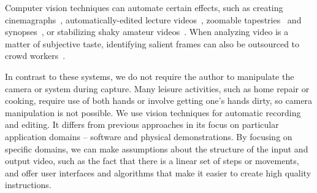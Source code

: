


Computer vision techniques can automate certain effects, such as creating cinemagraphs~\cite{Bai:2012, Joshi:2012}, automatically-edited lecture videos~\cite{Heck:2007}, zoomable tapestries~\cite{Barnes:2010} and synopses~\cite{Pritch:2009vl}, or stabilizing shaky amateur videos~\cite{Liu:2011}. When analyzing video is a matter of subjective taste, identifying salient frames can also be outsourced to crowd workers~\cite{Bernstein:2011uj}.

In contrast to these systems, we do not require the author to manipulate the camera or system during capture. Many leisure activities, such as home repair or cooking, require use of both hands or involve getting one's hands dirty, so camera manipulation is not possible. We use vision techniques for automatic recording and editing. It differs from previous approaches in its focus on particular application domains -- software and physical demonstrations. By focusing on specific domains, we can make assumptions about the structure of the input and output video, such as the fact that there is a linear set of steps or movements, and offer user interfaces and algorithms that make it easier to create high quality instructions.
